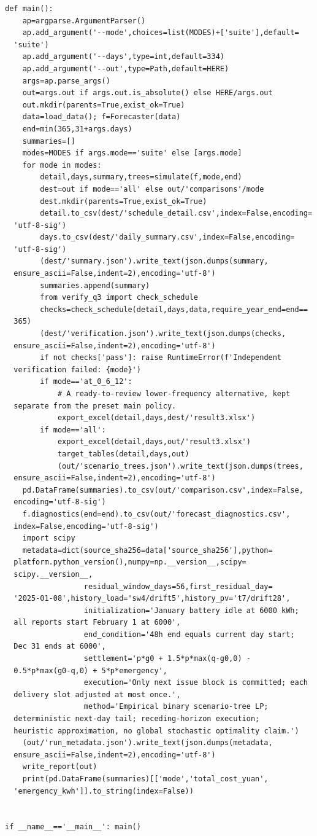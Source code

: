 \begin{verbatim}
def main():
    ap=argparse.ArgumentParser()
    ap.add_argument('--mode',choices=list(MODES)+['suite'],default=
  'suite')
    ap.add_argument('--days',type=int,default=334)
    ap.add_argument('--out',type=Path,default=HERE)
    args=ap.parse_args()
    out=args.out if args.out.is_absolute() else HERE/args.out
    out.mkdir(parents=True,exist_ok=True)
    data=load_data(); f=Forecaster(data)
    end=min(365,31+args.days)
    summaries=[]
    modes=MODES if args.mode=='suite' else [args.mode]
    for mode in modes:
        detail,days,summary,trees=simulate(f,mode,end)
        dest=out if mode=='all' else out/'comparisons'/mode
        dest.mkdir(parents=True,exist_ok=True)
        detail.to_csv(dest/'schedule_detail.csv',index=False,encoding=
  'utf-8-sig')
        days.to_csv(dest/'daily_summary.csv',index=False,encoding=
  'utf-8-sig')
        (dest/'summary.json').write_text(json.dumps(summary,
  ensure_ascii=False,indent=2),encoding='utf-8')
        summaries.append(summary)
        from verify_q3 import check_schedule
        checks=check_schedule(detail,days,data,require_year_end=end==
  365)
        (dest/'verification.json').write_text(json.dumps(checks,
  ensure_ascii=False,indent=2),encoding='utf-8')
        if not checks['pass']: raise RuntimeError(f'Independent
  verification failed: {mode}')
        if mode=='at_0_6_12':
            # A ready-to-review lower-frequency alternative, kept
  separate from the preset main policy.
            export_excel(detail,days,dest/'result3.xlsx')
        if mode=='all':
            export_excel(detail,days,out/'result3.xlsx')
            target_tables(detail,days,out)
            (out/'scenario_trees.json').write_text(json.dumps(trees,
  ensure_ascii=False,indent=2),encoding='utf-8')
    pd.DataFrame(summaries).to_csv(out/'comparison.csv',index=False,
  encoding='utf-8-sig')
    f.diagnostics(end=end).to_csv(out/'forecast_diagnostics.csv',
  index=False,encoding='utf-8-sig')
    import scipy
    metadata=dict(source_sha256=data['source_sha256'],python=
  platform.python_version(),numpy=np.__version__,scipy=
  scipy.__version__,
                  residual_window_days=56,first_residual_day=
  '2025-01-08',history_load='sw4/drift5',history_pv='t7/drift28',
                  initialization='January battery idle at 6000 kWh;
  all reports start February 1 at 6000',
                  end_condition='48h end equals current day start;
  Dec 31 ends at 6000',
                  settlement='p*g0 + 1.5*p*max(q-g0,0) -
  0.5*p*max(g0-q,0) + 5*p*emergency',
                  execution='Only next issue block is committed; each
  delivery slot adjusted at most once.',
                  method='Empirical binary scenario-tree LP;
  deterministic next-day tail; receding-horizon execution;
  heuristic approximation, no global stochastic optimality claim.')
    (out/'run_metadata.json').write_text(json.dumps(metadata,
  ensure_ascii=False,indent=2),encoding='utf-8')
    write_report(out)
    print(pd.DataFrame(summaries)[['mode','total_cost_yuan',
  'emergency_kwh']].to_string(index=False))


if __name__=='__main__': main()
\end{verbatim}

